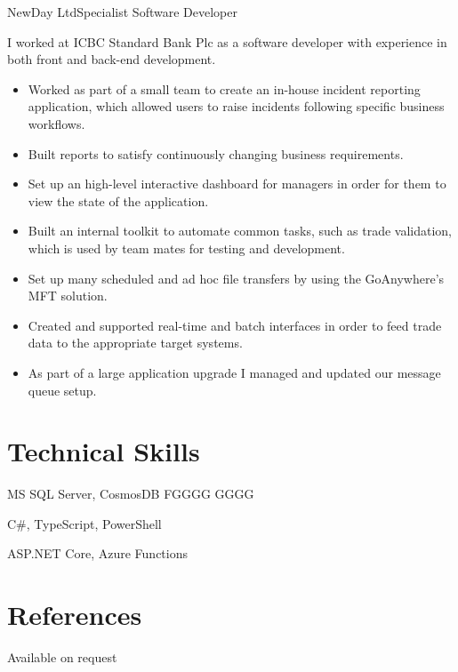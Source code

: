\documentclass[10pt,a4paper]{moderncv}
\begin{document}
        {NewDay Ltd}{Specialist Software Developer}{}{}
        {
        I worked at ICBC Standard Bank Plc as a software developer with experience in both front and back-end development.
        \begin{itemize}
            \item Worked as part of a small team to create an in-house incident reporting application, which allowed users to raise incidents following specific business workflows.
            \item Built reports to satisfy continuously changing business requirements.
            \item Set up an high-level interactive dashboard for managers in order for them to view the state of the application.
            \item Built an internal toolkit to automate common tasks, such as trade validation, which is used by team mates for testing and development.
            \item Set up many scheduled and ad hoc file transfers by using the GoAnywhere's MFT solution.
            \item Created and supported real-time and batch interfaces in order to feed trade data to the appropriate target systems.
            \item As part of a large application upgrade I managed and updated our message queue setup.
        \end{itemize}
        }
    
    
    
    
        \section{Technical Skills}
        {MS SQL Server, CosmosDB}
        {FGGGG}
        {GGGG}
    
        {C\#, TypeScript, PowerShell}
        {}
        {}
    
        {ASP.NET Core, Azure Functions }
        {}
        {}
    
    
        \section{References}
        \qquad \qquad \qquad \quad Available on request
    
    
\end{document}
